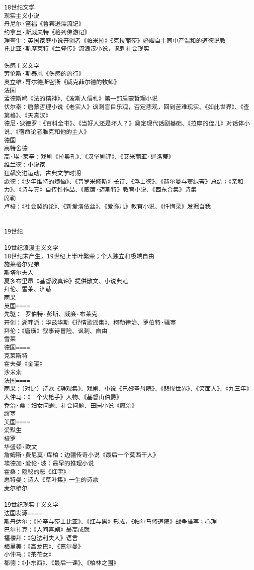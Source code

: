 \documentclass[UTF8]{../RepresentationUniverse}
\begin{document}
\begin{lstlisting}
18世纪文学
现实主义小说
丹尼尔·笛福《鲁宾逊漂流记》
约拿旦·斯威夫特《格列佛游记》
理查生：英国家庭小说开创者《帕米拉》《克拉丽莎》婚姻自主同中产温和的道德说教
托比亚·斯摩莱特《兰豋传》流浪汉小说，讽刺社会现实

伤感主义文学
劳伦斯·斯泰恩《伤感的旅行》
奥立维·哥尔德斯密斯《威克菲尔德的牧师》
法国
孟德斯鸠《法的精神》、《波斯人信札》第一部启蒙哲理小说
伏尔泰：启蒙哲理小说《老实人》讽刺盲目乐观，否定悲观，回到苦难现实、《如此世界》、《查第格》、《天真汉》
德尼·狄德罗：《百科全书》、《当好人还是坏人？》奠定现代话剧基础、《拉摩的侄儿》对话体小说、《宿命论者雅克和他的主人》
德国
高特舍德
高·埃·莱辛：戏剧《拉奥孔》、《汉堡剧评》、《艾米丽亚·迦洛蒂》
维兰德：小说家
狂飙突进运动，古典文学时期
歌德：《少年维特的烦恼》、《普罗米修斯》长诗、《浮士德》、《赫尔曼与窦绿苔》总结；《亲和力》、《诗与真》自传性作品、《威廉·迈斯特》教育小说、《西东合集》诗集
席勒
卢梭：《社会契约论》、《新爱洛依丝》、《爱弥儿》教育小说、《忏悔录》发掘自我


19世纪

19世纪浪漫主义文学
18世纪末产生，19世纪上半叶繁荣；个人独立和极端自由
施莱格尔兄弟
斯塔尔夫人
夏多布里昂《基督教真谛》提供散文、小说典范
拜伦、雪莱、济慈
雨果
英国====
先驱： 罗伯特·彭斯、威廉·布莱克
开创：湖畔派：华兹华斯《抒情歌谣集》、柯勒律治、罗伯特·骚塞
拜伦：《唐璜》叙事诗冒险、讽刺、自由
雪莱
德国====
克莱斯特
霍夫曼《金罐》
沙米索
法国====
雨果：（对比）诗歌《静观集》、戏剧、小说《巴黎圣母院》、《悲惨世界》、《笑面人》、《九三年》
大仲马：《三个火枪手》人物、《基督山伯爵》
乔治·桑：妇女问题、社会问题、田园小说《魔沼》
缪塞
美国====
爱默生
梭罗
华盛顿·欧文
詹姆斯·费尼莫·库柏：边疆传奇小说《最后一个莫西干人》
埃德加·爱伦·坡：最早的推理小说
霍桑：隐秘的恶《红字》
惠特曼：诗人《草叶集》一生的诗歌
麦尔维尔

19世纪现实主义文学
法国发源====
斯丹达尔：《拉辛与莎士比亚》、《红与黑》形成，《帕尔马修道院》战争描写；心理
巴尔扎克：《人间喜剧》最高成就
福楼拜：《包法利夫人》语言
梅里美：《高龙巴》、《嘉尔曼》
小仲马：《茶花女》
都德：《小东西》、《最后一课》、《柏林之围》


\end{lstlisting}
\end{document}
